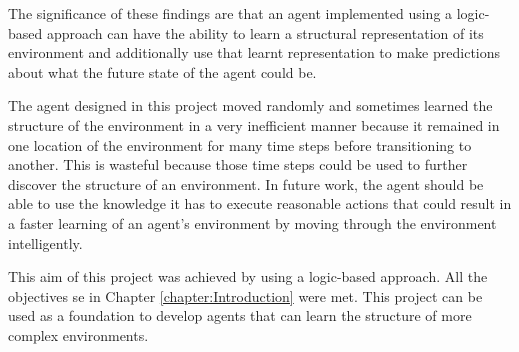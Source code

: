 The significance of these findings are that an agent implemented using a logic-based approach can have the ability to learn a structural representation of its environment and additionally use that learnt representation to make predictions about what the future state of the agent could be.


The agent designed in this project moved randomly and sometimes learned the structure of the environment in a very inefficient manner because it remained in one location of the environment for many time steps before transitioning to another. This is wasteful because those time steps could be used to further discover the structure of an environment. In future work, the agent should be able to use the knowledge it has to execute reasonable actions that could result in a faster learning of an agent's environment by moving through the environment intelligently.

This aim of this project was achieved by using a logic-based approach. All the objectives se in Chapter \ref{chapter:Introduction} were met. This project can be used as a foundation to develop agents that can learn the structure of more complex environments.  














